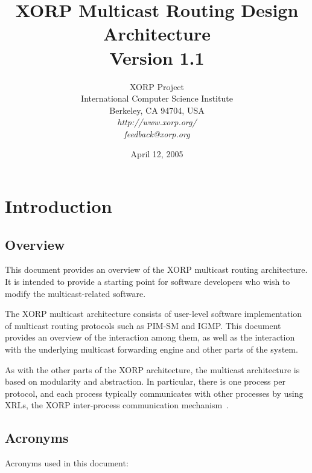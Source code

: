 \documentclass[11pt]{article}
\begin{document}
\title{XORP Multicast Routing Design Architecture \\
\vspace{1ex}
Version 1.1}
\author{ XORP Project					\\
	 International Computer Science Institute	\\
	 Berkeley, CA 94704, USA			\\
         {\it http://www.xorp.org/}			\\
	 {\it feedback@xorp.org}
}
\date{April 12, 2005}

\maketitle

\thispagestyle{empty}


\section{Introduction}


\subsection{Overview}

This document provides an overview of the XORP multicast routing
architecture.  It is intended to provide a starting point for software
developers who wish to modify the multicast-related software.

The XORP multicast architecture consists of user-level software
implementation of multicast routing protocols such as PIM-SM and IGMP.
This document provides an overview of the interaction among them,
as well as the interaction with the underlying multicast forwarding
engine and other parts of the system.

As with the other parts of the XORP architecture, the multicast
architecture is based on modularity and abstraction.
In particular, there is one process per protocol, and each process
typically communicates with other processes by using XRLs, the XORP
inter-process communication mechanism~\cite{xorp:xrl}.

\subsection{Acronyms}

Acronyms used in this document:
\end{document}
